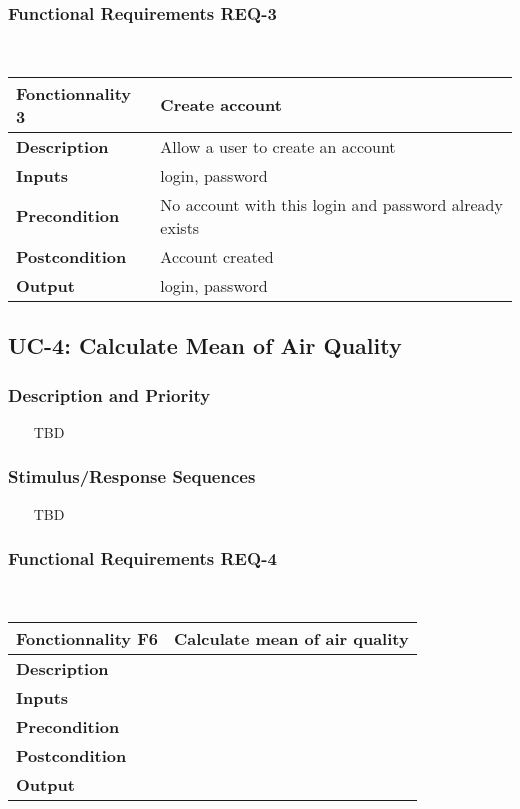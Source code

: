 \documentclass{report}
\begin{document}
\subsubsection*{Functional Requirements REQ-3} ~~~
\begin{center}
	\begin{tabular}{|m{4cm}|m{10cm}|}
	\hline
	\textbf{Fonctionnality 3} & Create account \\
	\hline
	\textbf{Description} & Allow a user to create an account \\
	\hline
	\textbf{Inputs} & login, password \\
	\hline
	\textbf{Precondition} & No account with this login and password already exists \\
	\hline
	\textbf{Postcondition} & Account created \\
	\hline
	\textbf{Output} & login, password \\
	\hline
	\end{tabular}
\end{center}

\subsection{UC-4: Calculate Mean of Air Quality}

\subsubsection*{Description and Priority} ~~~
TBD

\subsubsection*{Stimulus/Response Sequences} ~~~
TBD

\subsubsection*{Functional Requirements REQ-4} ~~~
\begin{center}
	\begin{tabular}{|m{4cm}|m{10cm}|}
	\hline
	\textbf{Fonctionnality F6} & Calculate mean of air quality \\
	\hline
	\textbf{Description} &  \\
	\hline
	\textbf{Inputs} &  \\
	\hline
	\textbf{Precondition} &  \\
	\hline
	\textbf{Postcondition} &  \\
	\hline
	\textbf{Output} &  \\
	\hline
	\end{tabular}
\end{center}
\end{document}
